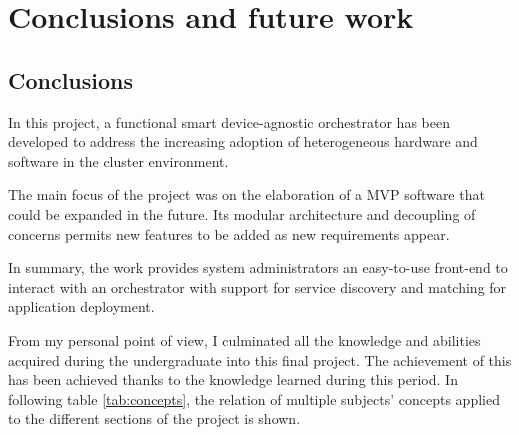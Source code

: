\section{Conclusions and future work}

    \subsection{Conclusions} \label{conclusions}
        In this project, a functional smart device-agnostic orchestrator has been developed to address the increasing adoption of heterogeneous hardware and software in the cluster environment.
        
        The main focus of the project was on the elaboration of a MVP software that could be expanded in the future. Its modular architecture and decoupling of concerns permits new features to be added as new requirements appear.
        
        In summary, the work provides system administrators an easy-to-use front-end to interact with an orchestrator with support for service discovery and matching for application deployment.
        
        From my personal point of view, I culminated all the knowledge and abilities acquired during the undergraduate into this final project. The achievement of this has been achieved thanks to the knowledge learned during this period. In following table \ref{tab:concepts}, the relation of multiple subjects' concepts applied to the different sections of the project is shown.
        
